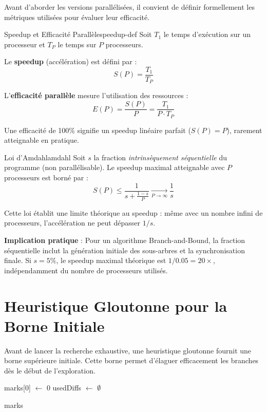 \documentclass[12pt,a4paper,twoside]{report}
\begin{document}
Avant d'aborder les versions parallélisées, il convient de définir formellement les métriques utilisées pour évaluer leur efficacité.

\begin{definition}{Speedup et Efficacité Parallèle}{speedup-def}
Soit $T_1$ le temps d'exécution sur un processeur et $T_P$ le temps sur $P$ processeurs.

Le \textbf{speedup} (accélération) est défini par :
\[
S(P) = \frac{T_1}{T_P}
\]

L'\textbf{efficacité parallèle} mesure l'utilisation des ressources :
\[
E(P) = \frac{S(P)}{P} = \frac{T_1}{P \cdot T_P}
\]

Une efficacité de 100\% signifie un speedup linéaire parfait ($S(P) = P$), rarement atteignable en pratique.
\end{definition}

\begin{theoreme}{Loi d'Amdahl}{amdahl}
Soit $s$ la fraction \textit{intrinsèquement séquentielle} du programme (non parallélisable). Le speedup maximal atteignable avec $P$ processeurs est borné par :
\[
S(P) \leq \frac{1}{s + \frac{1-s}{P}} \xrightarrow[P \to \infty]{} \frac{1}{s}
\]

Cette loi établit une limite théorique au speedup : même avec un nombre infini de processeurs, l'accélération ne peut dépasser $1/s$.
\end{theoreme}

\textbf{Implication pratique} : Pour un algorithme Branch-and-Bound, la fraction séquentielle inclut la génération initiale des sous-arbres et la synchronisation finale. Si $s = 5\%$, le speedup maximal théorique est $1/0.05 = 20\times$, indépendamment du nombre de processeurs utilisés.

\section{Heuristique Gloutonne pour la Borne Initiale}

Avant de lancer la recherche exhaustive, une heuristique gloutonne fournit une borne supérieure initiale. Cette borne permet d'élaguer efficacement les branches dès le début de l'exploration.

\begin{algorithm}[htbp]
\SetAlgoLined
{}

marks[0] $\leftarrow$ 0\;
usedDiffs $\leftarrow$ $\emptyset$\;


\Return marks\;
\caption{Heuristique gloutonne pour la borne initiale}
\label{algo:greedy}
\end{algorithm}
\end{document}
